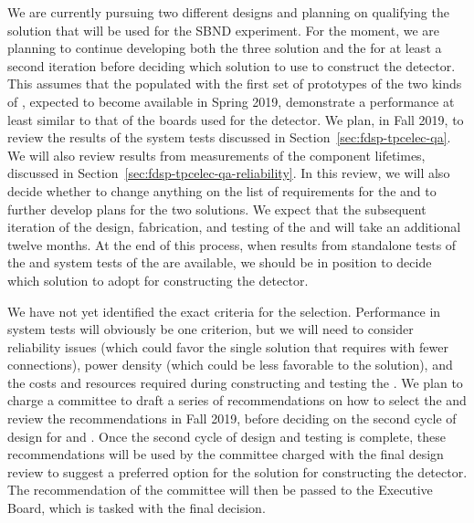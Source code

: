 We are currently pursuing two different  designs
and planning on qualifying the   solution that will be used for the SBND experiment.
For the moment, we are planning to continue developing 
both the three  solution and  the  
for at least a second iteration before deciding which  solution to use to construct
the   detector. This assumes that the 
populated with the first set of prototypes of the two kinds of
, expected to become available in Spring 2019,
demonstrate a performance at least similar to that of the
boards used for the  detector. We plan, in Fall 2019, to review the results of the system tests
discussed in Section~\ref{sec:fdsp-tpcelec-qa}. We will also
review results from measurements of the component lifetimes,
discussed in Section~\ref{sec:fdsp-tpcelec-qa-reliability}. In this review,
we will also decide whether to change anything on the list
of requirements for the  and to further develop
plans for the two solutions. We expect that the subsequent iteration
of the design, fabrication, and testing of the  and
 will take an additional twelve months. At
the end of this process, when results from standalone tests of the
 and system tests of the  are
available, we should be in position to decide which 
solution to adopt for constructing the   detector.

We have not yet identified the exact criteria for the
 selection. Performance in system tests will obviously
be one criterion, but we will need to consider reliability issues (which could favor the single 
solution that requires  with fewer connections), 
power density (which could be less favorable to the  solution),
and the costs and resources required during constructing
and testing the . We plan to charge a committee
to draft a series of recommendations on how to select the
 and review the recommendations in Fall
2019, before deciding on the second cycle of design for
 and . Once the second cycle of design
and testing is complete, these recommendations will be used by the
committee charged with the final design review to suggest a
preferred option for the  solution for 
constructing the   detector. The recommendation of
the committee will then be passed to the  Executive Board,
which is tasked with the final  decision.

